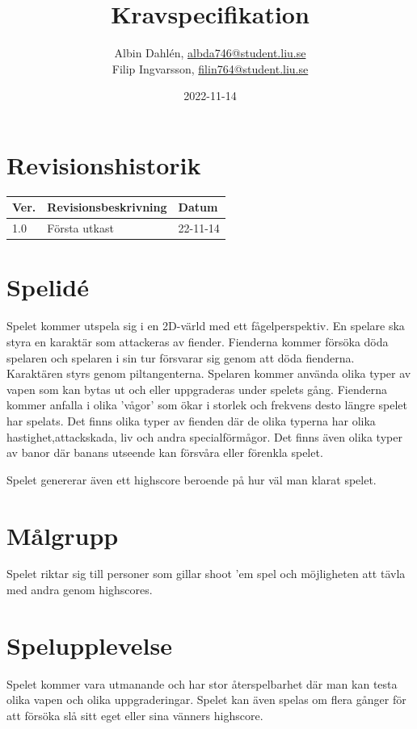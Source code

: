 \documentclass{TDP005mall}
\author{Albin Dahlén, \url{albda746@student.liu.se}\\
  Filip Ingvarsson, \url{filin764@student.liu.se}}
\title{Kravspecifikation}
\date{2022-11-14}
\begin{document}
\projectpage
\section{Revisionshistorik}
\begin{table}[!h]
\begin{tabularx}{\linewidth}{|l|X|l|}
\hline
Ver. & Revisionsbeskrivning & Datum \\\hline
1.0 & Första utkast & 22-11-14 \\\hline
\end{tabularx}
\end{table}


\section{Spelidé}
Spelet kommer utspela sig i en 2D-värld med ett fågelperspektiv. En spelare ska styra en karaktär som attackeras av fiender.
Fienderna kommer försöka döda spelaren och spelaren i sin tur försvarar sig genom att döda fienderna. Karaktären styrs genom piltangenterna.
Spelaren kommer använda olika typer av vapen som kan bytas ut och eller uppgraderas under spelets gång. Fienderna kommer anfalla i olika 'vågor' som ökar i storlek och frekvens desto längre spelet har spelats.
Det finns olika typer av fienden där de olika typerna har olika hastighet,attackskada, liv och andra specialförmågor. Det finns även olika typer av banor där banans utseende kan försvåra eller förenkla spelet.

Spelet genererar även ett highscore beroende på hur väl man klarat spelet.


\section{Målgrupp}
Spelet riktar sig till personer som gillar shoot 'em spel och möjligheten att tävla med andra genom highscores.

\section{Spelupplevelse}
Spelet kommer vara utmanande och har stor återspelbarhet där man kan testa olika vapen och olika uppgraderingar.
Spelet kan även spelas om flera gånger för att försöka slå sitt eget eller sina vänners highscore.
\end{document}
